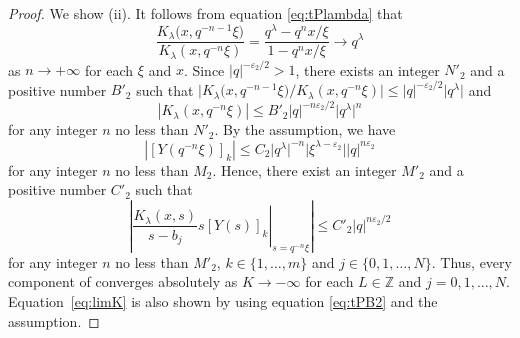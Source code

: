\documentclass[pdftex]{sigma}
\numberwithin{equation}{section}
\theoremstyle{definition}
\begin{document}
\begin{proof}
We show (ii).
It follows from equation \eqref{eq:tPlambda} that
\begin{equation*}
\frac{K_{\lambda}\bigl(x, q^{-n-1} \xi \bigr)}{K_{\lambda}(x, q^{-n} \xi )} = \frac{q^{\lambda } - q^n x/\xi }{1- q^n x/\xi } \to q^{\lambda }
\end{equation*}
as $n \to +\infty $ for each $\xi $ and $x$.
Since $|q| ^{-\varepsilon _2 /2} >1$, there exists an integer $N'_{2}$ and a positive number $B' _2 $ such that $\big| K_{\lambda}\bigl(x, q^{-n-1} \xi \bigr) / K_{\lambda}(x, q^{-n} \xi ) \big| \leq |q| ^{-\varepsilon _2 /2} \big|q^{\lambda } \big|$ and
\begin{equation}
| K_{\lambda}(x, q^{-n } \xi ) | \leq B' _2 |q|^{-n \varepsilon _2 /2 } \big|q^{\lambda } \big|^{n }
\label{eq:tPB2}
\end{equation}
for any integer $n$ no less than $N'_{2} $.
By the assumption, we have
\begin{equation*}
| [Y(q^{-n}\xi )]_k | \leq C_2 \big|q ^{\lambda }\big|^{-n} \big| \xi ^{\lambda - \varepsilon _2} \big| |q |^{ n \varepsilon _2 }
\end{equation*}
for any integer $n$ no less than $M_2 $.
Hence, there exist an integer $M' _2$ and a positive number $C' _2 $ such that
\begin{equation*}
\left|\left. \frac{ K_{\lambda}(x, s)}{s-b_{j}} s [Y(s)]_k \right| _{s= q^{-n}\xi } \right|\leq C'_2 |q |^{ n \varepsilon _2 /2 }
\end{equation*}
for any integer $ n$ no less than $ M'_2 $, $k \in \{ 1, \dots , m \}$ and $j \in \{ 0, 1, \dots , N \}$.
Thus, every component of  converges absolutely as $K \to -\infty $ for each $L \in \mathbb{Z} $ and $j=0,1,\dots ,N$.
Equation~\eqref{eq:limK} is also shown by using equation \eqref{eq:tPB2} and the assumption.
\end{proof}
\end{document}
